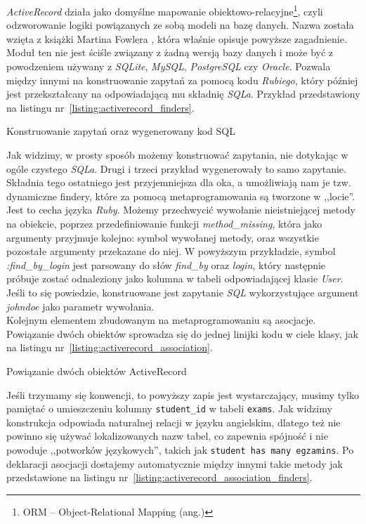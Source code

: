 \documentclass[a4paper,12pt]{article}
\begin{document}
\emph{ActiveRecord} działa jako domyślne mapowanie
obiektowo-relacyjne\footnote{ORM -- Object-Relational Mapping (ang.)},
czyli odzworowanie logiki powiązanych ze sobą modeli na bazę danych.
Nazwa została wzięta z książki Martina Fowlera \cite{martin-fowler}, która
właśnie opisuje powyższe zagadnienie. Moduł ten nie jest ściśle związany z żadną
wersją bazy danych i może być z powodzeniem używany z \emph{SQLite},
\emph{MySQL}, \emph{PostgreSQL} czy \emph{Oracle}. Pozwala między innymi na
konstruowanie zapytań za pomocą kodu \emph{Rubiego}, który później jest
przekształcany na odpowiadającą mu składnię \emph{SQLa}.
Przykład przedstawiony na listingu nr~\ref{listing:activerecord_finders}.

\begin{listing}
  
  \caption{Konstruowanie zapytań oraz wygenerowany kod SQL}
  \label{listing:activerecord_finders}
\end{listing}


Jak widzimy, w prosty sposób możemy konstruować zapytania, nie dotykając w ogóle
czystego \emph{SQLa}. Drugi i trzeci przykład wygenerowały to samo zapytanie.
Składnia tego ostatniego jest przyjemniejsza dla oka, a umożliwiają nam je tzw.
dynamiczne findery, które za pomocą metaprogramowania są tworzone w ,,locie''.
Jest to cecha języka \emph{Ruby}. Możemy przechwycić wywołanie nieistniejącej
metody na obiekcie, poprzez przedefiniowanie funkcji \emph{method\_missing},
która jako argumenty przyjmuje kolejno: symbol wywołanej metody, oraz wszystkie
pozostałe argumenty przekazane do niej. W powyższym przykładzie, symbol
\emph{:find\_by\_login} jest parsowany do słów \emph{find\_by} oraz \emph{login}, który
następnie próbuje zostać odnaleziony jako kolumna w tabeli odpowiadającej klasie
\emph{User}. Jeśli to się powiedzie, konstruowane jest zapytanie \emph{SQL}
wykorzystujące argument \emph{johndoe} jako parametr wywołania.\\
Kolejnym elementem zbudowanym na metaprogramowaniu są asocjacje. Powiązanie
dwóch obiektów sprowadza się do jednej linijki kodu w ciele klasy, jak na
listingu nr~\ref{listing:activerecord_association}.

\begin{listing}
  
  \caption{Powiązanie dwóch obiektów ActiveRecord}
  \label{listing:activerecord_association}
\end{listing}


Jeśli trzymamy się konwencji, to powyższy zapis jest wystarczający, musimy tylko
pamiętać o umieszczeniu kolumny \texttt{student\_id} w tabeli \texttt{exams}. Jak
widzimy konstrukcja odpowiada naturalnej relacji w języku angielskim, dlatego
też nie powinno się używać lokalizowanych nazw tabel, co zapewnia spójność i
nie powoduje ,,potworków językowych'', takich jak \texttt{student has many
egzamins}. Po deklaracji asocjacji dostajemy automatycznie między innymi takie
metody jak przedstawione na listingu nr~\ref{listing:activerecord_association_finders}.
\end{document}
